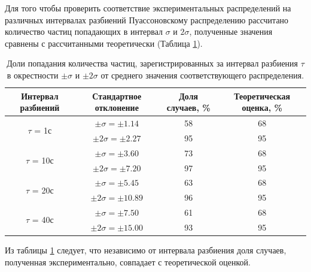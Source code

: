 \documentclass[12pt]{article}
\begin{document}
Для того чтобы проверить соответствие экспериментальных распределений на различных интервалах разбиений Пуассоновскому распределению 
рассчитано количество частиц попадающих в интервал $\sigma$ и $2\sigma$, полученные значения сравнены с рассчитанными теоретически\cite{LabBook}
(Таблица \ref{tab:4}).
\begin{table}[H]
    \begin{tabular}{|c|c|c|c|}
        \hline
        Интервал разбиений            & Стандартное отклонение      & Доля случаев, \% & Теоретическая оценка, \% \\
        \hline
        \multirow{2}{*}{$\tau$ = 1с}  & ${\pm}{\sigma} = \pm1.14$   & 58               & 68                       \\ 
                                      & ${\pm}{2\sigma} = \pm2.27$  & 95               & 95                       \\
        \hline
        \multirow{2}{*}{$\tau$ = 10с} & ${\pm}{\sigma} = \pm3.60$   & 73               & 68                       \\ 
                                      & ${\pm}{2\sigma} = \pm7.20$  & 97               & 95                       \\
        \hline
        \multirow{2}{*}{$\tau$ = 20с} & ${\pm}{\sigma} = \pm5.45$   & 63               & 68                       \\ 
                                      & ${\pm}{2\sigma} = \pm10.89$ & 96               & 95                       \\
        \hline
        \multirow{2}{*}{$\tau$ = 40с} & ${\pm}{\sigma} = \pm7.50$   & 61               & 68                       \\ 
                                      & ${\pm}{2\sigma} = \pm15.00$ & 93               & 95                       \\
        \hline
        
    \end{tabular}
    \caption{Доли попадания количества частиц, зарегистрированных за интервал разбиения $\tau$ в окрестности ${\pm}{\sigma}$ и ${\pm}{2\sigma}$
        от среднего значения соответствующего распределения.}
    \label{tab:4}
\end{table}
Из таблицы \ref{tab:4} следует, что независимо от интервала разбиения доля случаев, полученная экспериментально, 
совпадает с теоретической оценкой.
\end{document}
